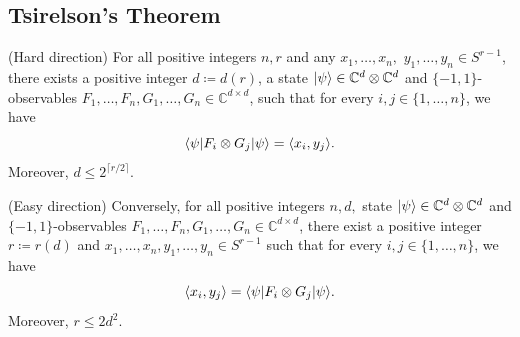 \subsection{Tsirelson's Theorem}
	\begin{theo}[Tsirelson] \label{theo:Tsirelson}
		(Hard direction) For all positive integers $n, r$ and any $x_1,\dots,x_n,$ $y_1,\dots,y_n\in S^{r-1}$, there exists a positive integer $d\coloneqq d(r)$, a state $\vert {\psi} \rangle\in\mathbb{C}^d\otimes\mathbb{C}^d$ and $\{-1,1\}$-observables $F_1,\dots,F_n,G_1,\dots,G_n\in \mathbb{C}^{d\times d}$, such that for every $i,j\in\{1,\dots,n\}$, we have
		\begin{equation}
			\langle {\psi} \vert F_i\otimes G_j \vert {\psi} \rangle = \langle{x_i},{y_j}\rangle.
		\end{equation}
		Moreover, $d\leq 2^{\lceil r/2 \rceil}$.
		
		(Easy direction) Conversely, for all positive integers $n,d,$ state $\vert {\psi} \rangle\in \mathbb{C}^d\otimes\mathbb{C}^d$ and $\{-1,1\}$-observables $F_1,\dots,F_n,G_1,\dots,G_n\in \mathbb{C}^{d\times d}$, there exist a positive integer $r\coloneqq r(d)$ and $x_1,\dots,x_n,y_1,\dots,y_n\in S^{r-1}$ such that for every $i,j\in\{1,\dots,n\}$, we have
		\begin{equation}
			\langle{x_i},{y_j}\rangle = \langle {\psi} \vert F_i\otimes G_j \vert {\psi} \rangle.
		\end{equation}
		Moreover, $r\leq 2d^2$.
	\end{theo}
